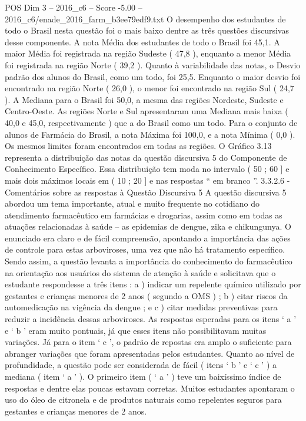 \begin{textsample}{POS Dim 3 – 2016\_c6 – Score -5.00 – 2016\_c6/enade\_2016\_farm\_b3ee79edf9.txt}
O desempenho dos estudantes de todo o Brasil nesta questão foi o mais baixo dentre as três questões discursivas desse componente.
A nota Média dos estudantes de todo o Brasil foi 45,1.
A maior Média foi registrada na região Sudeste ( 47,8 ), enquanto a menor Média foi registrada na região Norte ( 39,2 ).
Quanto à variabilidade das notas, o Desvio padrão dos alunos do Brasil, como um todo, foi 25,5.
Enquanto o maior desvio foi encontrado na região Norte ( 26,0 ), o menor foi encontrado na região Sul ( 24,7 ).
A Mediana para o Brasil foi 50,0, a mesma das regiões Nordeste, Sudeste e Centro-Oeste.
As regiões Norte e Sul apresentaram uma Mediana mais baixa ( 40,0 e 45,0, respectivamente ) que a do Brasil como um todo.
Para o conjunto de alunos de Farmácia do Brasil, a nota Máxima foi 100,0, e a nota Mínima ( 0,0 ).
Os mesmos limites foram encontrados em todas as regiões.
O Gráfico 3.13 representa a distribuição das notas da questão discursiva 5 do Componente de Conhecimento Específico.
Essa distribuição tem moda no intervalo ( 50 ; 60 ] e mais dois máximos locais em ( 10 ; 20 ] e nas respostas “ em branco ”. 3.3.2.6 - Comentários sobre as respostas à Questão Discursiva 5 A questão discursiva 5 abordou um tema importante, atual e muito frequente no cotidiano do atendimento farmacêutico em farmácias e drogarias, assim como em todas as atuações relacionadas à saúde – as epidemias de dengue, zika e chikungunya.
O enunciado era claro e de fácil compreensão, apontando a importância das ações de controle para estas arboviroses, uma vez que não há tratamento específico.
Sendo assim, a questão levanta a importância do conhecimento do farmacêutico na orientação aos usuários do sistema de atenção à saúde e solicitava que o estudante respondesse a três itens : a ) indicar um repelente químico utilizado por gestantes e crianças menores de 2 anos ( segundo a OMS ) ; b ) citar riscos da automedicação na vigência da dengue ; e c ) citar medidas preventivas para reduzir a incidência dessas arboviroses.
As respostas esperadas para os itens ‘ a ’ e ‘ b ’ eram muito pontuais, já que esses itens não possibilitavam muitas variações.
Já para o item ‘ c ’, o padrão de repostas era amplo o suficiente para abranger variações que foram apresentadas pelos estudantes.
Quanto ao nível de profundidade, a questão pode ser considerada de fácil ( itens ‘ b ’ e ‘ c ’ ) a mediana ( item ‘ a ’ ).
O primeiro item ( ‘ a ’ ) teve um baixíssimo índice de respostas e dentre elas poucas estavam corretas.
Muitos estudantes apontaram o uso do óleo de citronela e de produtos naturais como repelentes seguros para gestantes e crianças menores de 2 anos.

\end{textsample}
